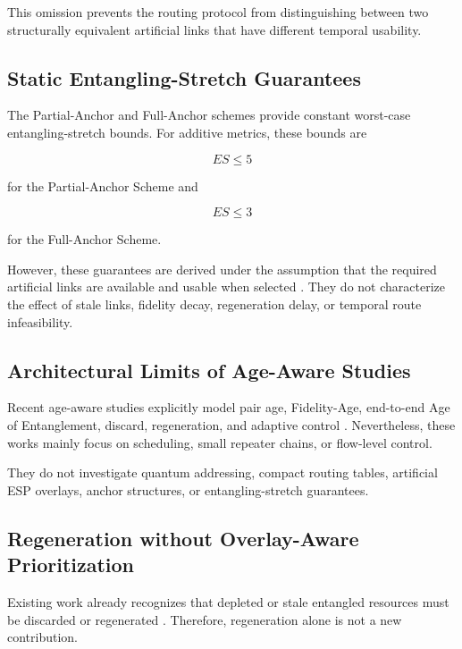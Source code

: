 This omission prevents the routing protocol from distinguishing between two structurally equivalent artificial links that have different temporal usability.

\subsection{Static Entangling-Stretch Guarantees}

The Partial-Anchor and Full-Anchor schemes provide constant worst-case entangling-stretch bounds. For additive metrics, these bounds are

\begin{equation}
    ES \leq 5
\end{equation}

for the Partial-Anchor Scheme and

\begin{equation}
    ES \leq 3
\end{equation}

for the Full-Anchor Scheme.

However, these guarantees are derived under the assumption that the required artificial links are available and usable when selected \cite{caleffi2025quantumarchitecture,wang2024fidelity,halder2024optimal}. They do not characterize the effect of stale links, fidelity decay, regeneration delay, or temporal route infeasibility.

\subsection{Architectural Limits of Age-Aware Studies}

Recent age-aware studies explicitly model pair age, Fidelity-Age, end-to-end Age of Entanglement, discard, regeneration, and adaptive control \cite{ercetin2026fidelityage,ceran2026age}. Nevertheless, these works mainly focus on scheduling, small repeater chains, or flow-level control.

They do not investigate quantum addressing, compact routing tables, artificial ESP overlays, anchor structures, or entangling-stretch guarantees.

\subsection{Regeneration without Overlay-Aware Prioritization}

Existing work already recognizes that depleted or stale entangled resources must be discarded or regenerated \cite{ercetin2026fidelityage,ceran2026age}. Therefore, regeneration alone is not a new contribution.

